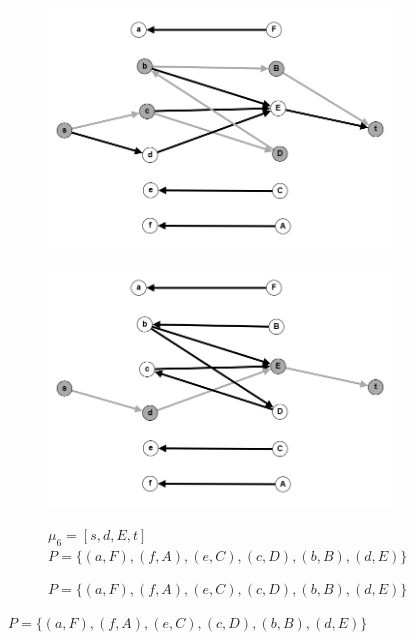 \documentclass{article}
\begin{document}
\begin{enumerate}
\begin{figure}
\begin{subfigure}[t]{0.32\textwidth}
         \includegraphics[width=\textwidth]{attachments/10/5.png}
         \label{fig:10_5}
     \end{subfigure}
    \hfill
     \begin{subfigure}[t]{0.32\textwidth}
        \centering
         \caption*{\small{$\mu_6 = [s, d,E,t]$\\$P =\{(a,F),(f,A),(e, C), (c,D), (b,B), (d, E)\}$}}
         \includegraphics[width=\textwidth]{attachments/10/6.png}
         \label{fig:10_6}
     \end{subfigure}
     \hfill
     \begin{subfigure}[t]{0.32\textwidth}
        \centering
         \caption*{\small{$P =\{(a,F),(f,A),(e, C), (c,D), (b,B), (d, E)\}$}}

\end{subfigure}
\end{figure}
\end{enumerate}
\end{document}
